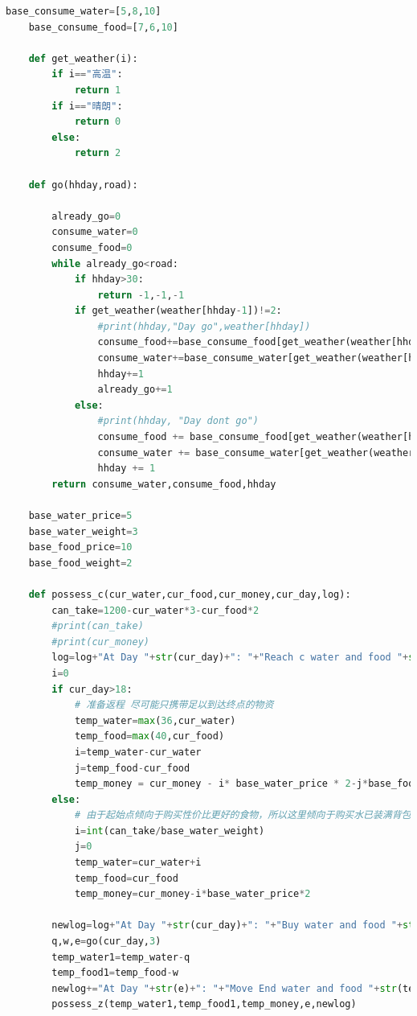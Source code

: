 \documentclass[withoutpreface,bwprint]{cumcmthesis} %
\begin{document}
\begin{appendices}
\begin{lstlisting}[language=python]
    base_consume_water=[5,8,10]
    base_consume_food=[7,6,10]
    
    def get_weather(i):
        if i=="高温":
            return 1
        if i=="晴朗":
            return 0
        else:
            return 2
    
    def go(hhday,road):
    
        already_go=0
        consume_water=0
        consume_food=0
        while already_go<road:
            if hhday>30:
                return -1,-1,-1
            if get_weather(weather[hhday-1])!=2:
                #print(hhday,"Day go",weather[hhday])
                consume_food+=base_consume_food[get_weather(weather[hhday-1])]*2
                consume_water+=base_consume_water[get_weather(weather[hhday-1])]*2
                hhday+=1
                already_go+=1
            else:
                #print(hhday, "Day dont go")
                consume_food += base_consume_food[get_weather(weather[hhday-1])]
                consume_water += base_consume_water[get_weather(weather[hhday-1])]
                hhday += 1
        return consume_water,consume_food,hhday
    
    base_water_price=5
    base_water_weight=3
    base_food_price=10
    base_food_weight=2
    
    def possess_c(cur_water,cur_food,cur_money,cur_day,log):
        can_take=1200-cur_water*3-cur_food*2
        #print(can_take)
        #print(cur_money)
        log=log+"At Day "+str(cur_day)+": "+"Reach c water and food "+str(cur_water)+" "+str(cur_food)+"\n"
        i=0
        if cur_day>18:
            # 准备返程 尽可能只携带足以到达终点的物资
            temp_water=max(36,cur_water)
            temp_food=max(40,cur_food)
            i=temp_water-cur_water
            j=temp_food-cur_food
            temp_money = cur_money - i* base_water_price * 2-j*base_food_price*2
        else:
            # 由于起始点倾向于购买性价比更好的食物，所以这里倾向于购买水已装满背包
            i=int(can_take/base_water_weight)
            j=0
            temp_water=cur_water+i
            temp_food=cur_food
            temp_money=cur_money-i*base_water_price*2
    
        newlog=log+"At Day "+str(cur_day)+": "+"Buy water and food "+str(i)+" "+"\n"
        q,w,e=go(cur_day,3)
        temp_water1=temp_water-q
        temp_food1=temp_food-w
        newlog+="At Day "+str(e)+": "+"Move End water and food "+str(temp_water1)+" "+str(temp_food1)+"\n"
        possess_z(temp_water1,temp_food1,temp_money,e,newlog)
    

\end{lstlisting}
\end{appendices}
\end{document}

